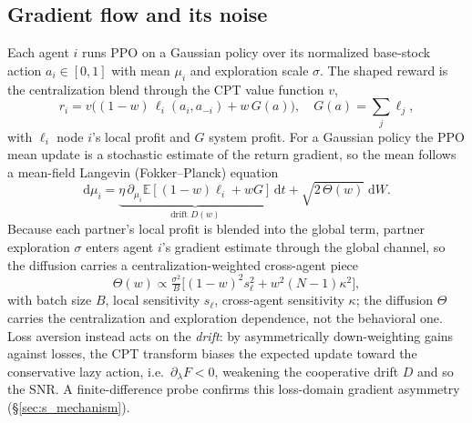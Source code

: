 \documentclass[letterpaper]{article} %
\theoremstyle{plain}
\begin{document}
\subsection{Gradient flow and its noise}
Each agent $i$ runs PPO on a Gaussian policy over its normalized base-stock action
$a_i\in[0,1]$ with mean $\mu_i$ and exploration scale $\sigma$. The shaped reward is the
centralization blend through the CPT value function $v$,
\begin{equation}
 r_i = v\!\big((1-w)\,\ell_i(a_i,a_{-i}) + w\,G(a)\big),\quad G(a)=\textstyle\sum_j \ell_j,
 \label{eq:blend}
\end{equation}
with $\ell_i$ node $i$'s local profit and $G$ system profit. For a Gaussian policy the PPO
mean update is a stochastic estimate of the return gradient, so the mean follows a mean-field
Langevin (Fokker--Planck) equation
\begin{equation}
 \mathrm{d}\mu_i = \underbrace{\eta\,\partial_{\mu_i}\mathbb{E}[(1{-}w)\ell_i + wG]}_{\text{drift } D(w)}\,\mathrm{d}t
 + \sqrt{2\,\Theta(w)}\;\mathrm{d}W .
 \label{eq:langevin}
\end{equation}
Because each partner's local profit is blended into the global term, partner exploration
$\sigma$ enters agent $i$'s gradient estimate through the global channel, so the diffusion
carries a centralization-weighted cross-agent piece
\begin{equation}
 \Theta(w)\propto\tfrac{\sigma^2}{B}\big[(1{-}w)^2 s_\ell^2 + w^2(N{-}1)\kappa^2\big],
 \label{eq:diffusion}
\end{equation}
with batch size $B$, local sensitivity $s_\ell$, cross-agent sensitivity $\kappa$; the diffusion
$\Theta$ carries the centralization and exploration dependence, not the behavioral one. Loss
aversion instead acts on the \emph{drift}: by asymmetrically down-weighting gains against losses,
the CPT transform biases the expected update toward the conservative lazy action, i.e.\
$\partial_\lambda F<0$, weakening the cooperative drift $D$ and so the SNR. A finite-difference
probe confirms this loss-domain gradient asymmetry (\S\ref{sec:s_mechanism}).
\end{document}
